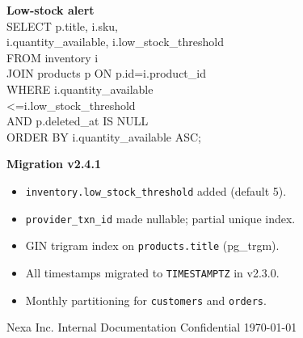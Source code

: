 \documentclass[8pt,a4paper]{extarticle}
\begin{document}
\vspace{2pt}

\begin{minipage}{0.48\textwidth}
  \begin{tcolorbox}[colback=bglight,colframe=accent!40,sharp corners,boxrule=0.3pt,
    left=2mm,right=2mm,top=1.5mm,bottom=1.5mm,before skip=1pt,after skip=0pt]
    {\fontsize{6.5}{8}\selectfont\color{primary}\textbf{Low-stock alert}}\\[0.5pt]
    {\fontsize{5.5}{7}\selectfont\ttfamily
      SELECT p.title, i.sku,\\
      \quad i.quantity\_available, i.low\_stock\_threshold\\
      \quad FROM inventory i\\
      \quad JOIN products p ON p.id=i.product\_id\\
      \quad WHERE i.quantity\_available\\
      \qquad <=i.low\_stock\_threshold\\
      \qquad AND p.deleted\_at IS NULL\\
      \quad ORDER BY i.quantity\_available ASC;
    }
  \end{tcolorbox}
\end{minipage}
\par
\begin{minipage}{0.48\textwidth}
  \begin{tcolorbox}[colback=secondary!6,colframe=secondary!50,sharp corners,boxrule=0.4pt,
    left=2mm,right=2mm,top=1.5mm,bottom=1.5mm,before skip=1pt,after skip=0pt]
    {\fontsize{6.5}{8}\selectfont\color{primary}\textbf{Migration v2.4.1}}
    \begin{itemize}
      \item \texttt{inventory.low\_stock\_threshold} added (default 5).
      \item \texttt{provider\_txn\_id} made nullable; partial unique index.
      \item GIN trigram index on \texttt{products.title} (pg\_trgm).
      \item All timestamps migrated to \texttt{TIMESTAMPTZ} in v2.3.0.
      \item Monthly partitioning for \texttt{customers} and \texttt{orders}.
    \end{itemize}
  \end{tcolorbox}
\end{minipage}
\par

\vfill
\begin{center}
  {\fontsize{6.5}{8}\selectfont\color{accent}
    Nexa Inc. \textbar{} Internal Documentation \textbar{} Confidential \textbar{} \today
  }
\end{center}
\end{document}
